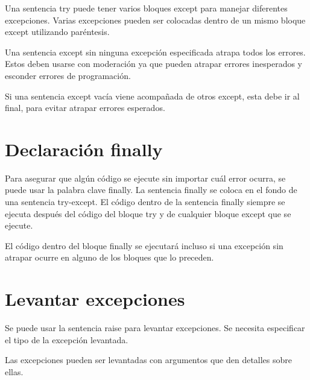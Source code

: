 \documentclass{report}
\begin{document}

Una sentencia try puede tener varios bloques except para manejar diferentes excepciones. Varias excepciones pueden ser colocadas dentro de un mismo bloque except utilizando paréntesis.


Una sentencia except sin ninguna excepción especificada atrapa todos los errores. Estos deben usarse con moderación ya que pueden atrapar errores inesperados y esconder errores de programación.


Si una sentencia except vacía viene acompañada de otros except, esta debe ir al final, para evitar atrapar errores esperados.

\section{Declaración finally}

Para asegurar que algún código se ejecute sin importar cuál error ocurra, se puede usar la palabra clave finally. La sentencia finally se coloca en el fondo de una sentencia try-except. El código dentro de la sentencia finally siempre se ejecuta después del código del bloque try y de cualquier bloque except que se ejecute.


El código dentro del bloque finally se ejecutará incluso si una excepción sin atrapar ocurre en alguno de los bloques que lo preceden.


\section{Levantar excepciones}

Se puede usar la sentencia raise para levantar excepciones. Se necesita especificar el tipo de la excepción levantada.


Las excepciones pueden ser levantadas con argumentos que den detalles sobre ellas.


\end{document}
